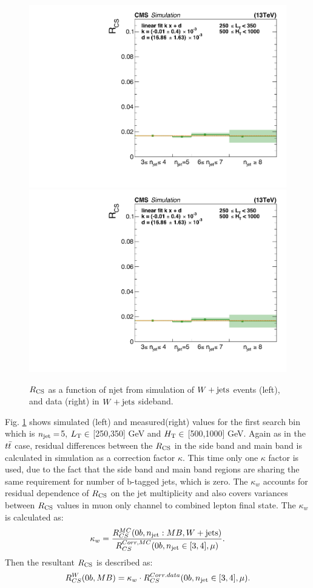 \begin{figure}[!hbt]
    \begin{center}
 \includegraphics[width=0.45 \textwidth]{Plots/analysis/RCS/st250-350_ht500-1000_njet8_nbtag0_Wjets_NegPdg_fit}
   \includegraphics[width=0.45 \textwidth]{Plots/analysis/RCS/st250-350_ht500-1000_njet8_nbtag0_Wjets_NegPdg_fit}
  \caption{ \label{RCS_dataMCw}  $R_{\rm CS}$ as a function of njet from simulation of $W+\textrm{jets}$ events (left), and data (right) in $W+\textrm{jets}$ sideband. }
  \end{center}
\end{figure}
Fig. \ref{RCS_dataMCw} shows simulated (left) and measured(right) values for the first search bin which is $n_{\rm jet} =$5, $L_{\rm T} \in$ [250,350] GeV and $H_{\rm T} \in$ [500,1000] GeV. Again as in the $t\bar{t}$ case, residual differences between the $R_{\rm CS}$ in the side band and main band is calculated in simulation as a correction factor $\kappa$. This time only one $\kappa$ factor is used, due to the fact that the side band and main band regions are sharing the same requirement for number of b-tagged jets, which is zero. The $\kappa_w$ accounts for residual dependence of $R_{\rm CS}$ on the jet multiplicity and also covers variances between $R_{\rm CS}$ values in muon only channel to combined lepton final state. The $\kappa_w$ is calculated as:
\begin{equation}
\label{kappa_w}
\kappa_w = \frac{R^{MC}_{CS}(0b,n_{\rm jet}: MB,W+\textrm{jets})}{R^{Corr, MC}_{CS}(0b,n_{\rm jet} \in [3,4],\mu)}.
\end{equation}
Then the resultant $R_{\rm CS}$ is described as:
\begin{equation}
R^{W}_{CS}(0b,MB) = {\kappa_w}\cdot{R^{Corr. data}_{CS}(0b,\ensuremath{n_{\rm jet}}\in [3,4], \mu)}.
\end{equation}
